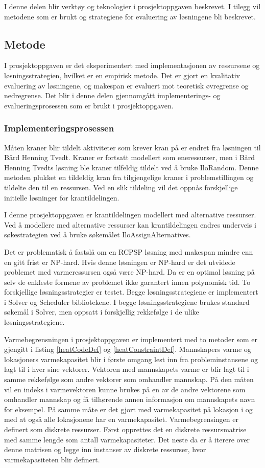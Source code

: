 I denne delen blir verktøy og teknologier i prosjektoppgaven beskrevet. I tilegg vil metodene som er brukt og strategiene for evaluering av løsningene bli beskrevet.

\subsection{Metode}
I prosjektoppgaven er det eksperimentert med implementasjonen av ressursene og løsningsstrategien, hvilket er en empirisk metode. Det er gjort en kvalitativ evaluering av løsningene, og makespan er evaluert mot teoretisk øvregrense og nedregrense. Det blir i denne delen gjennomgått implementerings- og evalueringsprosessen som er brukt i prosjektoppgaven.

\subsubsection{Implementeringsprosessen}
\label{sec:implprocess}
Måten kraner blir tildelt aktiviteter som krever kran på er endret fra løsningen til Bård Henning Tvedt. Kraner er fortsatt modellert som eneressurser, men i Bård Henning Tvedts løsning ble kraner tilfeldig tildelt ved å bruke IloRandom. Denne metoden plukket en tildeldig kran fra tilgjengelige kraner i problemstillingen og tildelte den til en ressursen. Ved en slik tildeling vil det oppnås forskjellige initielle løsninger for krantildelingen.

I denne prosjektoppgaven er krantildelingen modellert med alternative ressurser. Ved å modellere med alternative ressurser kan krantildelingen endres underveis i søkestrategien ved å bruke søkemålet IloAssignAlternatives.

Det er problematisk å fastslå om en RCPSP løsning med makespan mindre enn en gitt frist er NP-hard. Hvis denne løsningen er NP-hard er det utvidede problemet med varmeressursen også være NP-hard. Da er en optimal løsning på selv de enkleste formene av problemet ikke garantert innen polynomisk tid. To forskjellige løsningsstrategier er testet. Begge løsningsstrategiene er implementert i Solver og Scheduler bibliotekene. I begge løsningsstrategiene brukes standard søkemål i Solver, men oppsatt i forskjellig rekkefølge i de ulike løsningsstrategiene.

Varmebegrensningen i prosjektoppgaven er implementert med to metoder som er gjengitt i listing \ref{heatCodeDef} og \ref{heatConstraintDef}. Mannskapers varme og lokasjoners varmekapasitet blir i første omgang lest inn fra probleminstansene og lagt til i hver sine vektorer. Vektoren med mannskapets varme er blir lagt til i samme rekkefølge som andre vektorer som omhandler mannskap. På den måten vil en indeks i varmevektoren kunne brukes på en av de andre vektorene som omhandler mannskap og få tilhørende annen informasjon om mannskapets navn for eksempel. På samme måte er det gjort med varmekapasitet på lokasjon i og med at også alle lokasjonene har en varmekapasitet. Varmebegrensingen er definert som diskrete ressurser. Først opprettes det en diskrete ressursmatrise med samme lengde som antall varmekapasiteter. Det neste da er å iterere over denne matrisen og legge inn instanser av diskrete ressurser, hvor varmekapasiteten blir definert.

